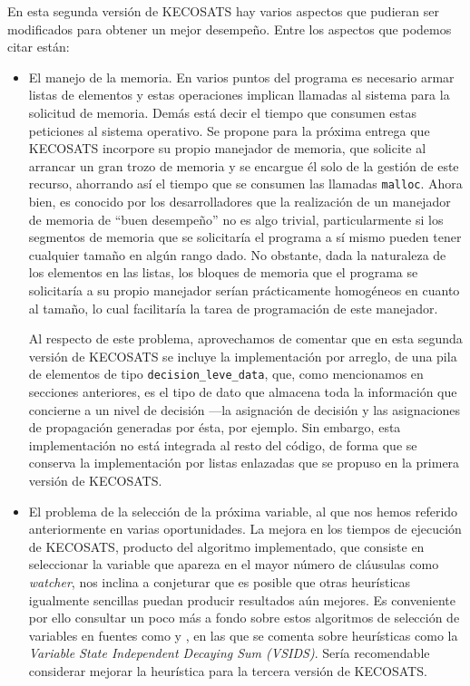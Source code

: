 \documentclass[12pt,lettersize,oneside]{article}
\begin{document}
En esta segunda versión de KECOSATS hay varios aspectos que pudieran ser
modificados para obtener un mejor desempeño. Entre los aspectos que podemos
citar están:
\begin{itemize}
\item El manejo de la memoria. En varios puntos del programa es necesario armar
  listas de elementos y estas operaciones implican llamadas al sistema para la
  solicitud de memoria. Demás está decir el tiempo que consumen estas peticiones
  al sistema operativo. Se propone para la próxima entrega que KECOSATS
  incorpore su propio manejador de memoria, que solicite al arrancar un gran
  trozo de memoria y se encargue él solo de la gestión de este recurso,
  ahorrando así el tiempo que se consumen las llamadas {\tt malloc}. Ahora bien,
  es conocido por los desarrolladores que la realización de un manejador de
  memoria de ``buen desempeño'' no es algo trivial, particularmente si los
  segmentos de memoria que se solicitaría el programa a sí mismo pueden tener
  cualquier tamaño en algún rango dado. No obstante, dada la naturaleza de los
  elementos en las listas, los bloques de memoria que el programa se solicitaría
  a su propio manejador serían prácticamente homogéneos en cuanto al tamaño, lo
  cual facilitaría la tarea de programación de este manejador.

  Al respecto de este problema, aprovechamos de comentar que en esta segunda
  versión de KECOSATS se incluye la implementación por arreglo, de una pila de
  elementos de tipo {\tt decision\_leve\_data}, que, como mencionamos en
  secciones anteriores, es el tipo de dato que almacena toda la información que
  concierne a un nivel de decisión ---la asignación de decisión y las
  asignaciones de propagación generadas por ésta, por ejemplo. Sin embargo, esta
  implementación no está integrada al resto del código, de forma que se conserva
  la implementación por listas enlazadas que se propuso en la primera versión de
  KECOSATS.

\item El problema de la selección de la próxima variable, al que nos hemos
  referido anteriormente en varias oportunidades. La mejora en los tiempos de
  ejecución de KECOSATS, producto del algoritmo implementado, que consiste en
  seleccionar la variable que apareza en el mayor número de cláusulas como
  \emph{watcher}, nos inclina a conjeturar que es posible que otras heurísticas
  igualmente sencillas puedan producir resultados aún mejores. Es conveniente
  por ello consultar un poco más a fondo sobre estos algoritmos de selección de
  variables en fuentes como \cite{Zhang} y \cite{ZhangThesis}, en las que se
  comenta sobre heurísticas como la  \emph{Variable State Independent Decaying
    Sum (VSIDS)}. Sería recomendable considerar mejorar la heurística para la
  tercera versión de KECOSATS.


\end{itemize}
\end{document}
